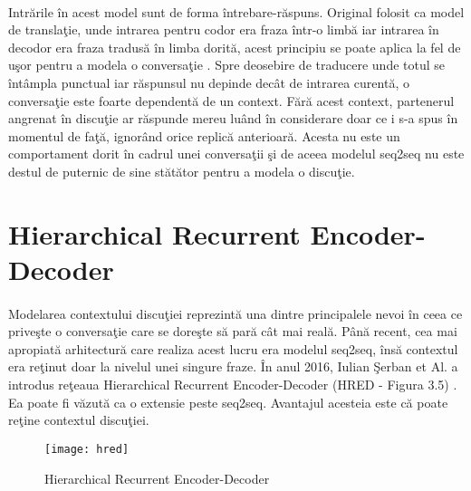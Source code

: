 \paragraph{}
Intr\u arile \^ in acest model sunt de forma \^ intrebare-r\u aspuns. Original folosit ca model de transla\c tie, unde intrarea pentru codor era fraza \^ intr-o limb\u a iar intrarea \^ in decodor era fraza tradus\u a \^ in limba dorit\u a, acest principiu se poate aplica la fel de u\c sor pentru a modela o conversa\c tie \cite{seq2seq-chatbots}. Spre deosebire de traducere unde totul se \^ int\^ ampla punctual iar r\u aspunsul nu depinde dec\^ at de intrarea curent\u a, o conversa\c tie este foarte dependent\u a de un context. F\u ar\u a acest context, partenerul angrenat \^ in discu\c tie ar r\u aspunde mereu lu\^ and \^ in considerare doar ce i s-a spus \^ in momentul de fa\c t\u a, ignor\^ and orice replic\u a anterioar\u a. Acesta nu este un comportament dorit \^ in cadrul unei conversa\c tii \c si de aceea modelul seq2seq nu este destul de puternic de sine st\u at\u ator pentru a modela o discu\c tie.

\section{Hierarchical Recurrent Encoder-Decoder}

\paragraph{}
Modelarea contextului discu\c tiei reprezint\u a una dintre principalele nevoi \^ in ceea ce prive\c ste o conversa\c tie care se dore\c ste s\u a par\u a c\^ at mai real\u a. P\^ an\u a recent, cea mai apropiat\u a arhitectur\u a care realiza acest lucru era modelul seq2seq, \^ ins\u a contextul era re\c tinut doar la nivelul unei singure fraze. \^ In anul 2016, Iulian \c Serban et Al. a introdus re\c teaua Hierarchical Recurrent Encoder-Decoder (HRED - Figura 3.5) \cite{DBLP:journals/corr/SerbanSBCP15}. Ea poate fi v\u azut\u a ca o extensie peste seq2seq. Avantajul acesteia este c\u a poate re\c tine contextul discu\c tiei.

\begin{figure}[H]
\centering
\texttt{[image: hred]}
\caption{Hierarchical Recurrent Encoder-Decoder}
\end{figure} 

